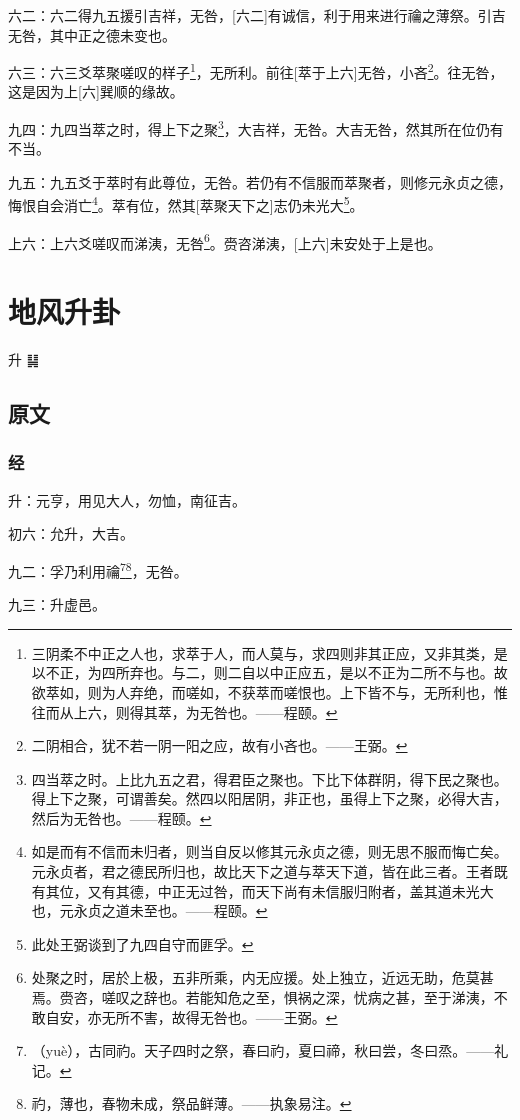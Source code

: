 \documentclass[12pt,oneside]{book}
\begin{document}
六二：六二得九五援引吉祥，无咎，[六二]有诚信，利于用来进行禴之薄祭。引吉无咎，其中正之德未变也。

六三：六三爻萃聚嗟叹的样子\footnote{三阴柔不中正之人也，求萃于人，而人莫与，求四则非其正应，又非其类，是以不正，为四所弃也。与二，则二自以中正应五，是以不正为二所不与也。故欲萃如，则为人弃绝，而嗟如，不获萃而嗟恨也。上下皆不与，无所利也，惟往而从上六，则得其萃，为无咎也。——程颐。}，无所利。前往[萃于上六]无咎，小吝\footnote{二阴相合，犹不若一阴一阳之应，故有小吝也。——王弼。}。往无咎，这是因为上[六]巽顺的缘故。

九四：九四当萃之时，得上下之聚\footnote{四当萃之时。上比九五之君，得君臣之聚也。下比下体群阴，得下民之聚也。得上下之聚，可谓善矣。然四以阳居阴，非正也，虽得上下之聚，必得大吉，然后为无咎也。——程颐。}，大吉祥，无咎。大吉无咎，然其所在位仍有不当。

九五：九五爻于萃时有此尊位，无咎。若仍有不信服而萃聚者，则修元永贞之德，悔恨自会消亡\footnote{如是而有不信而未归者，则当自反以修其元永贞之德，则无思不服而悔亡矣。元永贞者，君之德民所归也，故比天下之道与萃天下道，皆在此三者。王者既有其位，又有其德，中正无过咎，而天下尚有未信服归附者，盖其道未光大也，元永贞之道未至也。——程颐。}。萃有位，然其[萃聚天下之]志仍未光大\footnote{此处王弼谈到了九四自守而匪孚。}。

上六：上六爻嗟叹而涕洟，无咎\footnote{处聚之时，居於上极，五非所乘，内无应援。处上独立，近远无助，危莫甚焉。赍咨，嗟叹之辞也。若能知危之至，惧祸之深，忧病之甚，至于涕洟，不敢自安，亦无所不害，故得无咎也。——王弼。}。赍咨涕洟，[上六]未安处于上是也。


\chapter{地风升卦}
升 {\Large ䷭}

\section{原文}

\subsection{经}
升：元亨，用见大人，勿恤，南征吉。

初六：允升，大吉。

九二：孚乃利用禴\footnote{（yuè），古同礿。天子四时之祭，春曰礿，夏曰禘，秋曰尝，冬曰烝。——礼记。}\footnote{礿，薄也，春物未成，祭品鲜薄。——执象易注。}，无咎。

九三：升虚邑。
\end{document}
